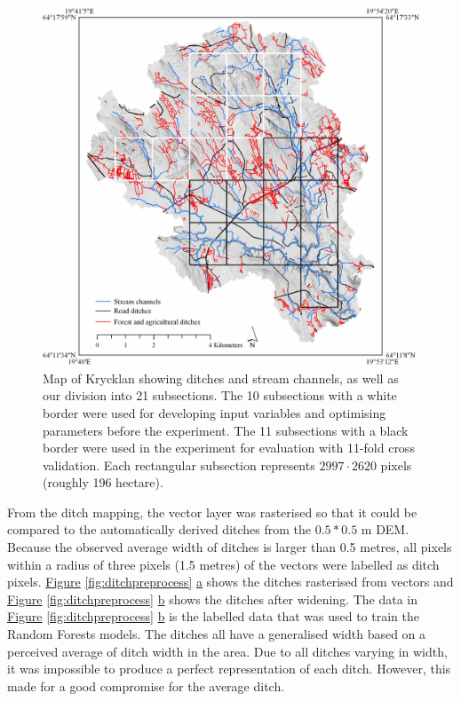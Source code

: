 \documentclass[]{interact}
\theoremstyle{plain}%
\theoremstyle{definition}
\theoremstyle{remark}
\begin{document}
\begin{figure}
    \centering
    \includegraphics[width=1\linewidth]{./images/Krycklan_lo.jpg}
    \caption{Map of Krycklan showing ditches and stream channels, as well as our division into 21 subsections. The 10 subsections with a white border were used for developing input variables and optimising parameters before the experiment. The 11 subsections with a black border were used in the experiment for evaluation with 11-fold cross validation. Each rectangular subsection represents $2997 \cdot 2620$ pixels (roughly 196 hectare).}
    \label{fig:swedenkrycklan}
\end{figure}

From the ditch mapping, the vector layer was rasterised so that it could be compared to the automatically derived ditches from the $0.5*0.5$ m DEM. Because the observed average width of ditches is larger than 0.5 metres, all pixels within a radius of three pixels (1.5 metres) of the vectors were labelled as ditch pixels. \hyperref[fig:ditchpreprocess]{Figure} \ref{fig:ditchpreprocess} \hyperref[fig:ditchpreprocess]{a} shows the ditches rasterised from vectors and \hyperref[fig:ditchpreprocess]{Figure} \ref{fig:ditchpreprocess} \hyperref[fig:ditchpreprocess]{b} shows the ditches after widening. The data in \hyperref[fig:ditchpreprocess]{Figure} \ref{fig:ditchpreprocess} \hyperref[fig:ditchpreprocess]{b} is the labelled data that was used to train the Random Forests models. The ditches all have a generalised width based on a perceived average of ditch width in the area. Due to all ditches varying in width, it was impossible to produce a perfect representation of each ditch. However, this made for a good compromise for the average ditch.
\end{document}
